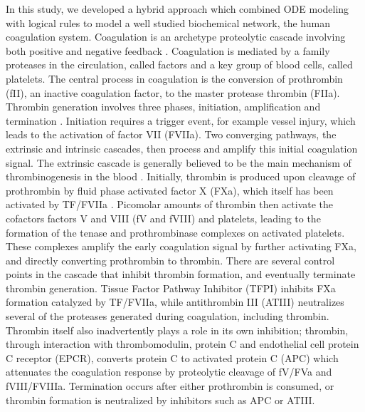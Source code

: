 \documentclass[12pt]{article}
\begin{document}
In this study, we developed a hybrid approach which combined ODE modeling with logical rules to model a well studied biochemical network, 
the human coagulation system. Coagulation is an archetype proteolytic cascade involving both positive 
and negative feedback \cite{Butenas:2002aa,Schenone:2004aa,Adams:2009aa}. 
Coagulation is mediated by a family proteases in the circulation, called factors and a key group of blood cells, called platelets. 
The central process in coagulation is the conversion of prothrombin (fII), an inactive coagulation factor, to the master protease thrombin (FIIa).
Thrombin generation involves three phases, initiation, amplification and termination \cite{GOLDHABER2006, Brummel:2002aa}.
Initiation requires a trigger event, for example vessel injury, which leads to the activation of factor VII (FVIIa).
Two converging pathways, the extrinsic and intrinsic cascades, then process and amplify this initial coagulation signal. 
The extrinsic cascade is generally believed to be the main mechanism of thrombinogenesis in the blood \cite{MANN1990,ROBERTS1998,MANN1999}.
Initially, thrombin is produced upon cleavage of prothrombin by fluid phase activated factor X (FXa), which itself has been activated by TF/FVIIa \cite{Butenas:2002aa}. 
Picomolar amounts of thrombin then activate the cofactors factors V and VIII (fV and fVIII) and platelets, 
leading to the formation of the tenase and prothrombinase complexes on activated platelets.
These complexes amplify the early coagulation signal by further activating FXa, and directly converting prothrombin to thrombin. 
There are several control points in the cascade that inhibit thrombin formation, and eventually terminate thrombin generation. 
Tissue Factor Pathway Inhibitor (TFPI) inhibits FXa formation catalyzed by TF/FVIIa, while antithrombin III (ATIII)
neutralizes several of the proteases generated during coagulation, including thrombin.  
Thrombin itself also inadvertently plays a role in its own inhibition; thrombin, through interaction with thrombomodulin, protein C and endothelial cell protein C receptor (EPCR),
converts protein C to activated protein C (APC) which attenuates the coagulation response by proteolytic cleavage of fV/FVa and fVIII/FVIIIa. 
Termination occurs after either prothrombin is consumed, or thrombin formation is neutralized by inhibitors such as APC or ATIII.   
\end{document}
